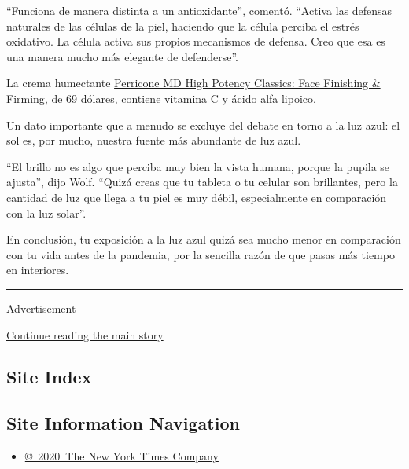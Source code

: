 ``Funciona de manera distinta a un antioxidante'', comentó. ``Activa las
defensas naturales de las células de la piel, haciendo que la célula
perciba el estrés oxidativo. La célula activa sus propios mecanismos de
defensa. Creo que esa es una manera mucho más elegante de defenderse''.

La crema humectante
\href{https://www.perriconemd.com/products/face-finishing-firming-moisturizer-51090023}{Perricone
MD High Potency Classics: Face Finishing \& Firming}, de 69 dólares,
contiene vitamina C y ácido alfa lipoico.

Un dato importante que a menudo se excluye del debate en torno a la luz
azul: el sol es, por mucho, nuestra fuente más abundante de luz azul.

``El brillo no es algo que perciba muy bien la vista humana, porque la
pupila se ajusta'', dijo Wolf. ``Quizá creas que tu tableta o tu celular
son brillantes, pero la cantidad de luz que llega a tu piel es muy
débil, especialmente en comparación con la luz solar''.

En conclusión, tu exposición a la luz azul quizá sea mucho menor en
comparación con tu vida antes de la pandemia, por la sencilla razón de
que pasas más tiempo en interiores.

\begin{center}\rule{0.5\linewidth}{\linethickness}\end{center}

Advertisement

\protect\hyperlink{after-bottom}{Continue reading the main story}

\hypertarget{site-index}{%
\subsection{Site Index}\label{site-index}}

\hypertarget{site-information-navigation}{%
\subsection{Site Information
Navigation}\label{site-information-navigation}}

\begin{itemize}
\tightlist
\item
  \href{https://help.nytimes3xbfgragh.onion/hc/en-us/articles/115014792127-Copyright-notice}{©~2020~The
  New York Times Company}
\end{itemize}

